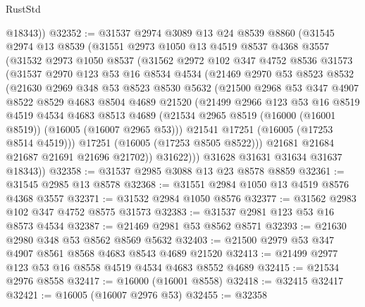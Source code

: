 \begin{lexlean}{RustStd}
\begin{coremodule}
        @18343))
@32352 := @31537
    @2974
    @3089
    @13
    @24
    @8539
    @8860
    (@31545
      @2974
      @13
      @8539
      (@31551
        @2973
        @1050
        @13
        @4519
        @8537
        @4368
        @3557
        (@31532
          @2973
          @1050
          @8537
          (@31562
            @2972
            @102
            @347
            @4752
            @8536
            @31573
            (@31537
              @2970
              @123
              @53
              @16
              @8534
              @4534
              (@21469
                @2970
                @53
                @8523
                @8532
                (@21630
                  @2969
                  @348
                  @53
                  @8523
                  @8530
                  @5632
                  (@21500
                    @2968
                    @53
                    @347
                    @4907
                    @8522
                    @8529
                    @4683
                    @8504
                    @4689
                    @21520
                    (@21499
                      @2966
                      @123
                      @53
                      @16
                      @8519
                      @4519
                      @4534
                      @4683
                      @8513
                      @4689
                      (@21534 @2965 @8519 (@16000 (@16001 @8519)) (@16005 (@16007 @2965 @53)))
                      @21541
                      @17251
                      (@16005 (@17253 @8514 @4519)))
                    @17251
                    (@16005 (@17253 @8505 @8522)))
                  @21681
                  @21684
                  @21687
                  @21691
                  @21696
                  @21702))
              @31622)))
        @31628
        @31631
        @31634
        @31637
        @18343))
@32358 := @31537 @2985 @3088 @13 @23 @8578 @8859
@32361 := @31545 @2985 @13 @8578
@32368 := @31551 @2984 @1050 @13 @4519 @8576 @4368 @3557
@32371 := @31532 @2984 @1050 @8576
@32377 := @31562 @2983 @102 @347 @4752 @8575 @31573
@32383 := @31537 @2981 @123 @53 @16 @8573 @4534
@32387 := @21469 @2981 @53 @8562 @8571
@32393 := @21630 @2980 @348 @53 @8562 @8569 @5632
@32403 := @21500 @2979 @53 @347 @4907 @8561 @8568 @4683 @8543 @4689 @21520
@32413 := @21499 @2977 @123 @53 @16 @8558 @4519 @4534 @4683 @8552 @4689
@32415 := @21534 @2976 @8558
@32417 := @16000 (@16001 @8558)
@32418 := @32415 @32417
@32421 := @16005 (@16007 @2976 @53)
@32455 := @32358

\end{coremodule}
\end{lexlean}
